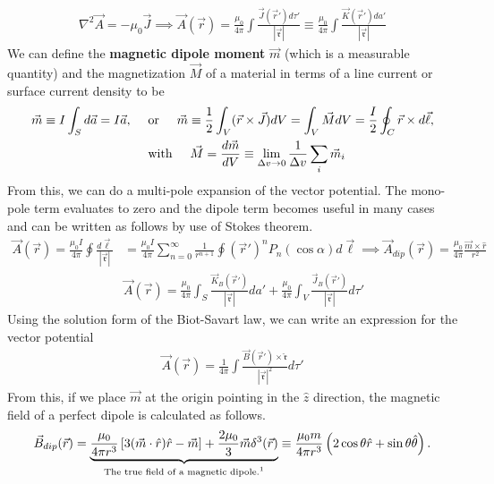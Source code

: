\begin{align}
	\nabla^2\vec{A} = -\mu_0 \vec{J} \implies \vec{A}(\vec{r}) = \frac{\mu_0}{4\pi}\int \frac{\vec{J}(\vec{r}')d\tau'}{|\vec{\mathfrak{r}}|} \equiv \frac{\mu_0}{4\pi}\int \frac{\vec{K}(\vec{r}')da'}{|\vec{\mathfrak{r}}|}
\end{align}
We can define the \textbf{magnetic dipole moment} $\vec{m}$ (which is a measurable quantity) and the magnetization $\vec{M}$ of a material in terms of a line current or surface current density to be
\begin{align}
	\vec{m} \equiv I \int_S d\vec{a} = I\vec{a}, \hspace{0.5cm}&\textrm{or}\hspace{0.5cm} \vec{m} \equiv \frac{1}{2}\int_V(\vec{r}\times \vec{J})dV= \int_V \vec{M}  dV = \frac{I}{2}\oint_C \vec{r}\times d\vec{\ell}, \\ &\textrm{with}\hspace{0.5cm} \vec{M} = \frac{d\vec{m}}{dV} \equiv \lim\limits_{\Delta v \rightarrow 0}\frac{1}{\Delta v}\sum_{i}\vec{m}_i 
\end{align} 
From this, we can do a multi-pole expansion of the vector potential. The mono-pole term evaluates to zero and the dipole term becomes useful in many cases and can be written as follows by use of Stokes theorem.
\begin{align}
	\vec{A}(\vec{r}) = \frac{\mu_0 I}{4\pi}\oint\frac{d\vec{\ell}}{|\vec{\mathfrak{r}}|} &= \frac{\mu_0 I}{4\pi}\sum_{n=0}^{\infty}\frac{1}{r^{n+1}}\oint(\vec{r}')^nP_n(\cos\alpha)
	d\vec{\ell}\implies \vec{A}_{dip}(\vec{r}) = \frac{\mu_0}{4\pi}\frac{\vec{m}\times\hat{r}}{r^2} \\
	&\vec{A}(\vec{r})=\frac{\mu_0}{4\pi}\int_S\frac{\vec{K}_B(\vec{r}')}{|\vec{\mathfrak{r}}|}da'+\frac{\mu_0}{4\pi}\int_V\frac{\vec{J}_B(\vec{r}')}{|\vec{\mathfrak{r}}|}d\tau'
\end{align}
Using the solution form of the Biot-Savart law, we can write an expression for the vector potential
\begin{align}
	\vec{A}(\vec{r}) = \frac{1}{4\pi}\int\frac{\vec{B}(\vec{r}')\times \hat{\mathfrak{r}}}{|\vec{\mathfrak{r}}|^2}d\tau'
\end{align}
From this, if we place $\vec{m}$ at the origin pointing in the $\hat{z}$ direction, the magnetic field of a perfect dipole is calculated as follows. 
\begin{align}
	\vec{B}_{dip}(\vec{r}) = \underbrace{\frac{\mu_0}{4\pi r^3}\left[3(\vec{m}\cdot \hat{r})\hat{r}-\vec{m}\right]+\frac{2\mu_0}{3}\vec{m}\delta^3(\vec{r})}_{\textrm{The true field of a magnetic dipole.\footnotemark}} \equiv \frac{\mu_0 m}{4\pi r^3}\left(2\cos\theta\hat{r}+\sin\theta\hat{\theta}\right).
\end{align}
